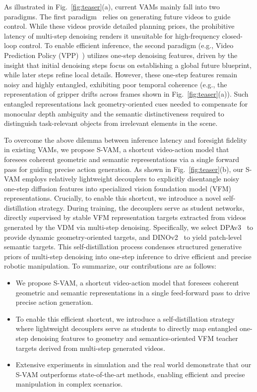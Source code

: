 \documentclass[runningheads]{llncs}
\begin{document}
As illustrated in Fig.~\ref{fig:teaser}(a), current VAMs mainly fall into two paradigms.
The first paradigm~\cite{black2024zeroshot,du2023learning,feng2025vidar, dreamzero2025, kim2026cosmos} relies on generating future videos to guide control. While these videos provide detailed planning priors, the prohibitive latency of multi-step denoising renders it unsuitable for high-frequency closed-loop control. To enable efficient inference, the second paradigm (e.g., Video Prediction Policy (VPP)~\cite{huvideo}) utilizes one-step denoising features, driven by the insight that initial denoising steps focus on establishing a global future blueprint, while later steps refine local details. However, these one-step features remain noisy and highly entangled, exhibiting poor temporal coherence (e.g., the representation of gripper drifts across frames shown in Fig.~\ref{fig:teaser}(a)).
Such entangled representations lack geometry-oriented cues needed to compensate for monocular depth ambiguity and the semantic distinctiveness required to distinguish task-relevant objects from irrelevant elements in the scene.

To overcome the above dilemma between inference latency and foresight fidelity in existing VAMs, we propose S-VAM, a shortcut video-action model that foresees coherent geometric and semantic representations via a single forward pass for guiding precise action generation. As shown in Fig.~\ref{fig:teaser}(b), our S-VAM employs relatively lightweight decouplers to explicitly disentangle noisy one-step diffusion features into specialized vision foundation model (VFM) representations. Crucially, to enable this shortcut, we introduce a novel self-distillation strategy. During training, the decouplers serve as student networks, directly supervised by stable VFM representation targets extracted from videos generated by the VDM via multi-step denoising. Specifically, we select DPAv3~\cite{lin2025depth} to provide dynamic geometry-oriented targets, and DINOv2~\cite{oquab2023dinov2} to yield patch-level semantic targets. This self-distillation process condenses structured generative priors of multi-step denoising into one-step inference to drive efficient and precise robotic manipulation.
To summarize, our contributions are as follows:



\begin{itemize}
  \item We propose S-VAM, a shortcut video-action model that foresees coherent geometric and semantic representations in a single feed-forward pass to drive precise action generation.
  \item To enable this efficient shortcut, we introduce a self-distillation strategy where lightweight decouplers serve as students to directly map entangled one-step denoising features to geometry and semantics-oriented VFM teacher targets derived from multi-step generated videos.
  \item Extensive experiments in simulation and the real world demonstrate that our S-VAM outperforms state-of-the-art methods, enabling efficient and precise manipulation in complex scenarios.
\end{itemize}
\end{document}
